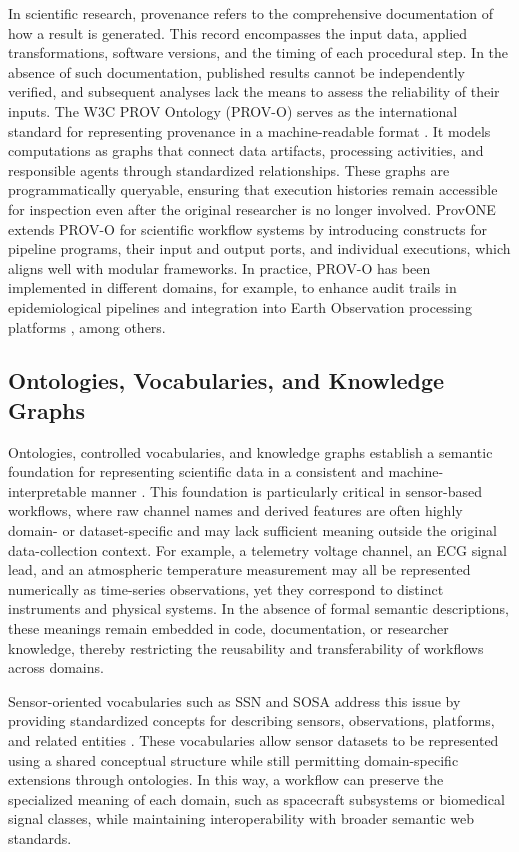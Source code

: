 \documentclass[conference]{IEEEtran}
\begin{document}
In scientific research, provenance refers to the comprehensive documentation of how a result is generated. This record encompasses the input data, applied transformations, software versions, and the timing of each procedural step. In the absence of such documentation, published results cannot be independently verified, and subsequent analyses lack the means to assess the reliability of their inputs. The W3C PROV Ontology (PROV-O) serves as the international standard for representing provenance in a machine-readable format \cite{provo2013}. It models computations as graphs that connect data artifacts, processing activities, and responsible agents through standardized relationships. These graphs are programmatically queryable, ensuring that execution histories remain accessible for inspection even after the original researcher is no longer involved. ProvONE \cite{missier2013provone} extends PROV-O for scientific workflow systems by introducing constructs for pipeline programs, their input and output ports, and individual executions, which aligns well with modular frameworks. In practice, PROV-O has been implemented in different domains, for example, to enhance audit trails in epidemiological pipelines \cite{mitchell2022fair} and integration into Earth Observation processing platforms \cite{omidi2025openeo}, among others.

\subsection{Ontologies, Vocabularies, and Knowledge Graphs}

Ontologies, controlled vocabularies, and knowledge graphs establish a semantic foundation for representing scientific data in a consistent and machine-interpretable manner \cite{wilkinson2016fair}. This foundation is particularly critical in sensor-based workflows, where raw channel names and derived features are often highly domain- or dataset-specific and may lack sufficient meaning outside the original data-collection context. For example, a telemetry voltage channel, an ECG signal lead, and an atmospheric temperature measurement may all be represented numerically as time-series observations, yet they correspond to distinct instruments and physical systems. In the absence of formal semantic descriptions, these meanings remain embedded in code, documentation, or researcher knowledge, thereby restricting the reusability and transferability of workflows across domains.

Sensor-oriented vocabularies such as SSN and SOSA address this issue by providing standardized concepts for describing sensors, observations, platforms, and related entities \cite{haller2019ssn,compton2012ssn}. These vocabularies allow sensor datasets to be represented using a shared conceptual structure while still permitting domain-specific extensions through ontologies. In this way, a workflow can preserve the specialized meaning of each domain, such as spacecraft subsystems or biomedical signal classes, while maintaining interoperability with broader semantic web standards.
\end{document}
